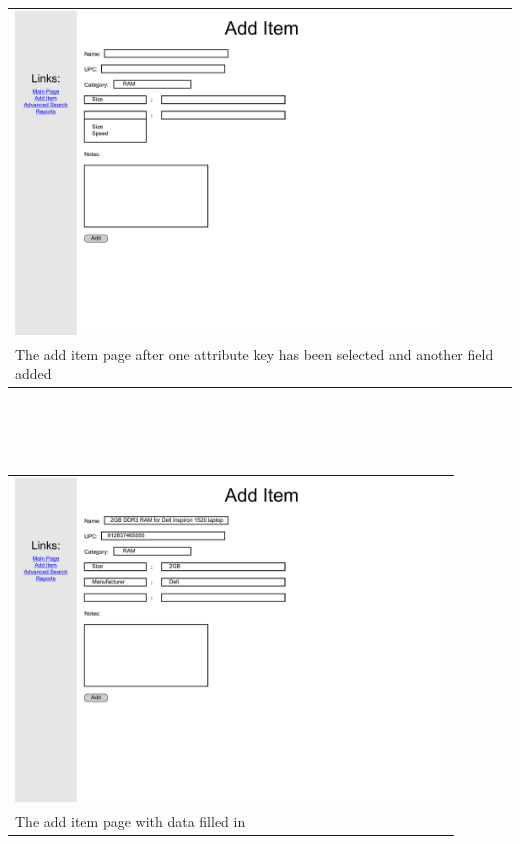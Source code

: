 \documentclass{article}
\begin{document}
\begin{tabular}{ p{4.5in} }
\includegraphics[keepaspectratio, width=4.5in]{addItemF0S3.pdf}\\
The add item page after one attribute key has been selected and another field added
\end{tabular}\\
~\\
~\\
\begin{tabular}{ p{4.5in} }
\includegraphics[keepaspectratio, width=4.5in]{addItemF0S5.pdf}\\
The add item page with data filled in
\end{tabular}\\
~\\
~\\
\end{document}
